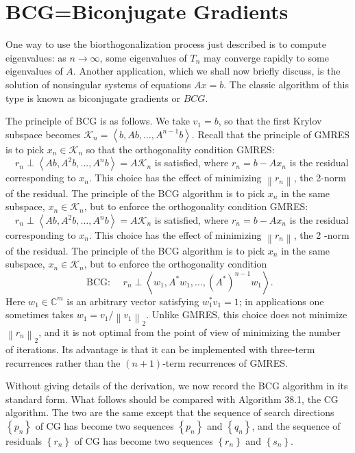 \section{BCG=Biconjugate Gradients}

One way to use the biorthogonalization process just described is to compute eigenvalues: as $n \rightarrow \infty$, some eigenvalues of $T_n$ may converge rapidly to some eigenvalues of $A$. Another application, which we shall now briefly discuss, is the solution of nonsingular systems of equations $A x=b$. The classic algorithm of this type is known as biconjugate gradients or $B C G$.

The principle of BCG is as follows. We take $v_1=b$, so that the first Krylov subspace becomes $\mathcal{K}_n=\left\langle b, A b, \ldots, A^{n-1} b\right\rangle$. Recall that the principle of GMRES is to pick $x_n \in \mathcal{K}_n$ so that the orthogonality condition
GMRES: $\quad r_n \perp\left\langle A b, A^2 b, \ldots, A^n b\right\rangle=A \mathcal{K}_n$
is satisfied, where $r_n=b-A x_n$ is the residual corresponding to $x_n$. This choice has the effect of minimizing $\left\|r_n\right\|$, the 2-norm of the residual. The principle of the BCG algorithm is to pick $x_n$ in the same subspace, $x_n \in \mathcal{K}_n$, but to enforce the orthogonality condition
GMRES: $\quad r_n \perp\left\langle A b, A^2 b, \ldots, A^n b\right\rangle=A \mathcal{K}_n$
is satisfied, where $r_n=b-A x_n$ is the residual corresponding to $x_n$. This choice has the effect of minimizing $\left\|r_n\right\|$, the 2 -norm of the residual. The principle of the BCG algorithm is to pick $x_n$ in the same subspace, $x_n \in \mathcal{K}_n$, but to enforce the orthogonality condition
$$
\text { BCG: } \quad r_n \perp\left\langle w_1, A^* w_1, \ldots,\left(A^*\right)^{n-1} w_1\right\rangle .
$$
Here $w_1 \in \mathbb{C}^m$ is an arbitrary vector satisfying $w_1^* v_1=1$; in applications one sometimes takes $w_1=v_1 /\left\|v_1\right\|_2$. Unlike GMRES, this choice does not minimize $\left\|r_n\right\|_2$, and it is not optimal from the point of view of minimizing the number of iterations. Its advantage is that it can be implemented with three-term recurrences rather than the $(n+1)$-term recurrences of GMRES.

Without giving details of the derivation, we now record the BCG algorithm in its standard form. What follows should be compared with Algorithm 38.1, the CG algorithm. The two are the same except that the sequence of search directions $\left\{p_n\right\}$ of CG has become two sequences $\left\{p_n\right\}$ and $\left\{q_n\right\}$, and the sequence of residuals $\left\{r_n\right\}$ of CG has become two sequences $\left\{r_n\right\}$ and $\left\{s_n\right\}$.


